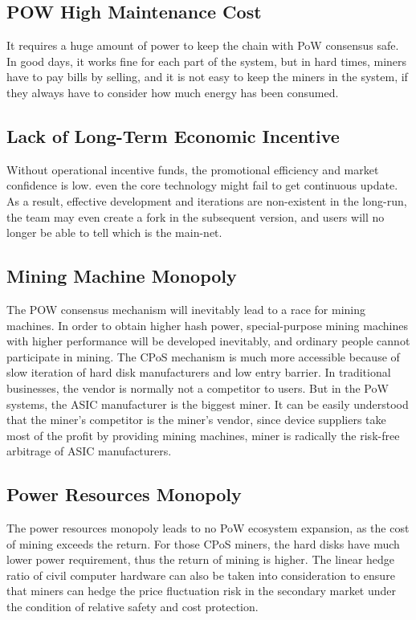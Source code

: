\subsection{POW High Maintenance Cost}
\begin{flushleft}
    It requires a huge amount of power to keep the chain with PoW consensus safe. In good days, it works fine for each part of the system, but in hard times, miners have to pay bills by selling, and it is not easy to keep the miners in the system, if they always have to consider how much energy has been consumed.
\end{flushleft}
\subsection{Lack of Long-Term Economic Incentive}
\begin{flushleft}
    Without operational incentive funds, the promotional efficiency and market confidence is low. even the core technology might fail to get continuous update. As a result, effective development and iterations are non-existent in the long-run, the team may even create a fork in the subsequent version, and users will no longer be able to tell which is the main-net.
\end{flushleft}
\subsection{Mining Machine Monopoly}
\begin{flushleft}
    The POW consensus mechanism will inevitably lead to a race for mining machines. In order to obtain higher hash power, special-purpose mining machines with higher performance will be developed inevitably, and ordinary people cannot participate in mining. The CPoS mechanism is much more accessible because of slow iteration of hard disk manufacturers and low entry barrier. In traditional businesses, the vendor is normally not a competitor to users. But in the PoW systems, the ASIC manufacturer is the biggest miner. It can be easily understood that the miner's competitor is the miner's vendor, since device suppliers take most of the profit by providing mining machines, miner is radically the risk-free arbitrage of ASIC manufacturers.
\end{flushleft}
\subsection{Power Resources Monopoly}
\begin{flushleft}
    The power resources monopoly leads to no PoW ecosystem expansion, as the cost of mining exceeds the return. For those CPoS miners, the hard disks have much lower power requirement, thus the return of mining is higher. The linear hedge ratio of civil computer hardware can also be taken into consideration to ensure that miners can hedge the price fluctuation risk in the secondary market under the condition of relative safety and cost protection.
\end{flushleft}
